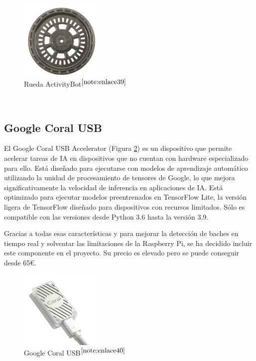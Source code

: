 \begin{figure} [h!]
	\begin{center}
		\includegraphics[width=4cm]{figs/wheel.png}
	\end{center}
	\caption{Rueda ActivityBot$^{\ref{note:enlace39}}$} 
\label{fig:wheel}
\end{figure}\

\setcounter{footnote}{39} %

\subsection{Google Coral USB}

El Google Coral USB Accelerator (Figura \ref{fig:googlecoral}) es un dispositivo que permite acelerar tareas de \ac{IA} en dispositivos que no cuentan con hardware especializado para ello. Está diseñado para ejecutarse con modelos de aprendizaje automático utilizando la unidad de procesamiento de tensores de Google, lo que mejora significativamente la velocidad de inferencia en aplicaciones de \acs{IA}. Está optimizado para ejecutar modelos preentrenados en TensorFlow Lite, la versión ligera de TensorFlow diseñado para dispositivos con recursos limitados. Sólo es compatible con  las versiones desde Python 3.6 hasta la versión 3.9.

Gracias a todas esas características y para mejorar la detección de baches en tiempo real y solventar las limitaciones de la Raspberry Pi, se ha decidido incluir este componente en el proyecto. Su precio es elevado pero se puede conseguir desde 65€.
 
\begin{figure} [h!]
	\begin{center}
		\includegraphics[width=4cm]{figs/googlecoral.png}
	\end{center}
	\caption{Google Coral USB$^{\ref{note:enlace40}}$} 
	\label{fig:googlecoral}
\end{figure}\


